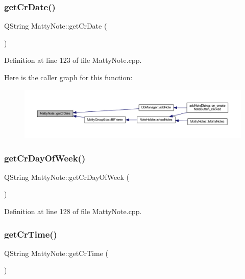 \subsubsection{\texorpdfstring{get\+Cr\+Date()}{getCrDate()}}
{\footnotesize\ttfamily Q\+String Matty\+Note\+::get\+Cr\+Date (\begin{DoxyParamCaption}{ }\end{DoxyParamCaption})}



Definition at line 123 of file Matty\+Note.\+cpp.

Here is the caller graph for this function\+:
\nopagebreak
\begin{figure}[H]
\begin{center}
\leavevmode
\includegraphics[width=350pt]{classMattyNote_ade5ef053d6d9ba158d9842feadd39754_icgraph}
\end{center}
\end{figure}
\hypertarget{classMattyNote_a92dca9930c5f9b00991a780fc89acb8f}{}\label{classMattyNote_a92dca9930c5f9b00991a780fc89acb8f} 
\subsubsection{\texorpdfstring{get\+Cr\+Day\+Of\+Week()}{getCrDayOfWeek()}}
{\footnotesize\ttfamily Q\+String Matty\+Note\+::get\+Cr\+Day\+Of\+Week (\begin{DoxyParamCaption}{ }\end{DoxyParamCaption})}



Definition at line 128 of file Matty\+Note.\+cpp.

\hypertarget{classMattyNote_a2acf19aded7d4b5c29db7af6b0c4b1f6}{}\label{classMattyNote_a2acf19aded7d4b5c29db7af6b0c4b1f6} 
\subsubsection{\texorpdfstring{get\+Cr\+Time()}{getCrTime()}}
{\footnotesize\ttfamily Q\+String Matty\+Note\+::get\+Cr\+Time (\begin{DoxyParamCaption}{ }\end{DoxyParamCaption})}



